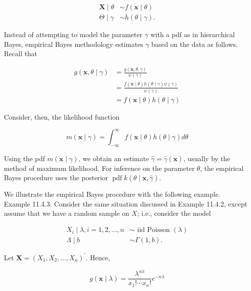 $$
\begin{aligned}
\mathbf{X} \mid \theta & \sim f(\mathbf{x} \mid \theta) \\
\Theta \mid \gamma & \sim h(\theta \mid \gamma) .
\end{aligned}
$$

Instead of attempting to model the parameter $\gamma$ with a pdf as in hierarchical Bayes, empirical Bayes methodology estimates $\gamma$ based on the data as follows. Recall that

$$
\begin{aligned}
g(\mathbf{x}, \theta \mid \gamma) & =\frac{g(\mathbf{x}, \theta, \gamma)}{\psi(\gamma)} \\
& =\frac{f(\mathbf{x} \mid \theta) h(\theta \mid \gamma) \psi(\gamma)}{\psi(\gamma)} \\
& =f(\mathbf{x} \mid \theta) h(\theta \mid \gamma)
\end{aligned}
$$

Consider, then, the likelihood function


\begin{equation*}
m(\mathbf{x} \mid \gamma)=\int_{-\infty}^{\infty} f(\mathbf{x} \mid \theta) h(\theta \mid \gamma) d \theta \tag{11.4.13}
\end{equation*}


Using the pdf $m(\mathbf{x} \mid \gamma)$, we obtain an estimate $\widehat{\gamma}=\widehat{\gamma}(\mathbf{x})$, usually by the method of maximum likelihood. For inference on the parameter $\theta$, the empirical Bayes procedure uses the posterior $\operatorname{pdf} k(\theta \mid \mathbf{x}, \widehat{\gamma})$.

We illustrate the empirical Bayes procedure with the following example.\\
Example 11.4.3. Consider the same situation discussed in Example 11.4.2, except assume that we have a random sample on $X$; i.e., consider the model

$$
\begin{aligned}
X_{i} \mid \lambda, i=1,2, \ldots, n & \sim \text { iid Poisson }(\lambda) \\
\Lambda \mid b & \sim \Gamma(1, b) .
\end{aligned}
$$

Let $\mathbf{X}=\left(X_{1}, X_{2}, \ldots, X_{n}\right)^{\prime}$. Hence,

$$
g(\mathbf{x} \mid \lambda)=\frac{\lambda^{n \bar{x}}}{x_{1}!\cdots x_{n}!} e^{-n \lambda}
$$

